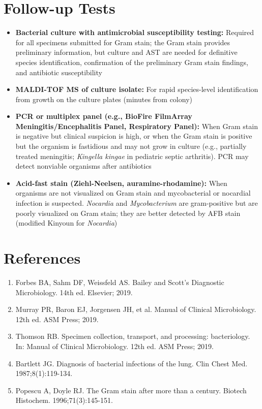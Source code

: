 \section*{Follow-up Tests}
\begin{itemize}
  \item \textbf{Bacterial culture with antimicrobial susceptibility testing:} Required for all specimens submitted for Gram stain; the Gram stain provides preliminary information, but culture and AST are needed for definitive species identification, confirmation of the preliminary Gram stain findings, and antibiotic susceptibility
  \item \textbf{MALDI-TOF MS of culture isolate:} For rapid species-level identification from growth on the culture plates (minutes from colony)
  \item \textbf{PCR or multiplex panel (e.g., BioFire FilmArray Meningitis/Encephalitis Panel, Respiratory Panel):} When Gram stain is negative but clinical suspicion is high, or when the Gram stain is positive but the organism is fastidious and may not grow in culture (e.g., partially treated meningitis; \textit{Kingella kingae} in pediatric septic arthritis). PCR may detect nonviable organisms after antibiotics
  \item \textbf{Acid-fast stain (Ziehl-Neelsen, auramine-rhodamine):} When organisms are not visualized on Gram stain and mycobacterial or nocardial infection is suspected. \textit{Nocardia} and \textit{Mycobacterium} are gram-positive but are poorly visualized on Gram stain; they are better detected by AFB stain (modified Kinyoun for \textit{Nocardia})
\end{itemize}

\section*{References}
\begin{enumerate}
  \item Forbes BA, Sahm DF, Weissfeld AS. Bailey and Scott's Diagnostic Microbiology. 14th ed. Elsevier; 2019.
  \item Murray PR, Baron EJ, Jorgensen JH, et al. Manual of Clinical Microbiology. 12th ed. ASM Press; 2019.
  \item Thomson RB. Specimen collection, transport, and processing: bacteriology. In: Manual of Clinical Microbiology. 12th ed. ASM Press; 2019.
  \item Bartlett JG. Diagnosis of bacterial infections of the lung. Clin Chest Med. 1987;8(1):119-134.
  \item Popescu A, Doyle RJ. The Gram stain after more than a century. Biotech Histochem. 1996;71(3):145-151.
\end{enumerate}

\clearpage
